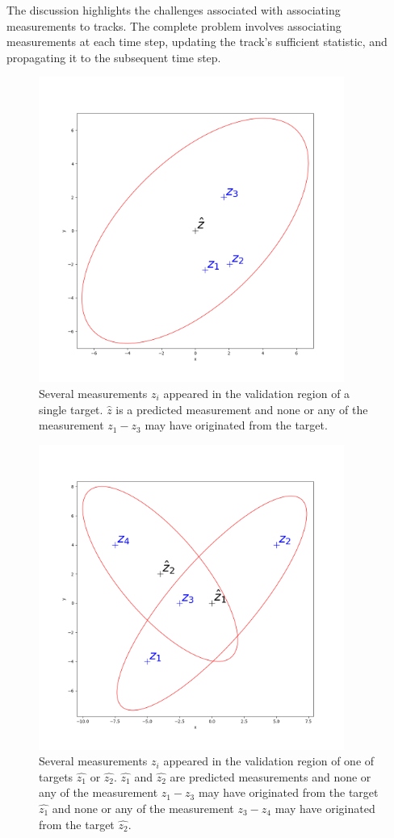 The discussion highlights the challenges associated with associating measurements to tracks. The complete problem
involves associating measurements at each time step, updating the track's sufficient statistic, and propagating it to
the subsequent time step.
\begin{figure}[H]
    \centering
    \includegraphics[width=10cm]{text/chapter_02/imgs/clutter_singleTarget}
    \caption{Several measurements $z_i$ appeared in the validation region of a single target. $\hat{z}$ is a predicted
    measurement and none or any of the measurement $z_1 - z_3$ may have originated from the target.}
    \label{fig:singleTargetInClutter}
\end{figure}

\begin{figure}[H]
    \centering
    \includegraphics[width=10cm]{text/chapter_02/imgs/clutter_multiTarget}
    \caption{Several measurements $z_i$ appeared in the validation region of one of targets $\hat{z_1}$ or $\hat{z_2}$. $\hat{z_1}$ and $\hat{z_2}$ are predicted
    measurements and none or any of the measurement $z_1 - z_3$ may have originated from the target $\hat{z_1}$ and none or any of the measurement $z_3 - z_4$ may have originated from the target $\hat{z_2}$.}
    \label{fig:twoTargetsInClutter}
\end{figure}


